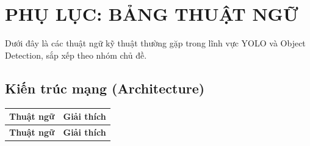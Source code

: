 \chapter*{PHỤ LỤC: BẢNG THUẬT NGỮ}

Dưới đây là các thuật ngữ kỹ thuật thường gặp trong lĩnh vực YOLO và Object Detection, sắp xếp theo nhóm chủ đề.

\section*{Kiến trúc mạng (Architecture)}

\begin{longtable}{p{3.5cm}p{12cm}}
\toprule
\textbf{Thuật ngữ} & \textbf{Giải thích} \\
\midrule
\endfirsthead
\toprule
\textbf{Thuật ngữ} & \textbf{Giải thích} \\
\midrule
\endhead


\end{longtable}
